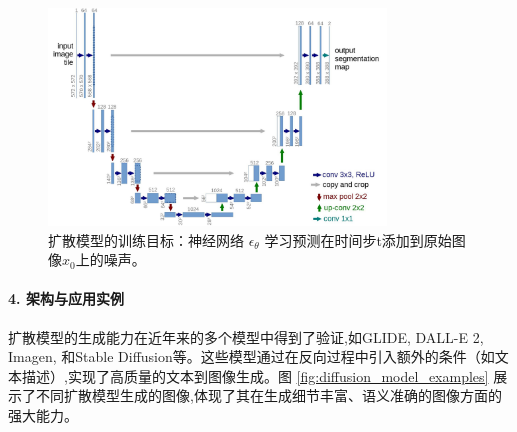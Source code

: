 \begin{itemize}
    \begin{figure}[htbp]
        \centering
        \includegraphics[width=0.8\textwidth]{figures/D3.png}
        \caption{扩散模型的训练目标：神经网络 $\epsilon_\theta$ 学习预测在时间步t添加到原始图像$x_0$上的噪声。}
        \label{fig:diffusion_training_objective}
    \end{figure}

    \paragraph{4. 架构与应用实例}
    扩散模型的生成能力在近年来的多个模型中得到了验证,如GLIDE, DALL-E 2, Imagen, 和Stable Diffusion等。这些模型通过在反向过程中引入额外的条件（如文本描述）,实现了高质量的文本到图像生成。图 \ref{fig:diffusion_model_examples} 展示了不同扩散模型生成的图像,体现了其在生成细节丰富、语义准确的图像方面的强大能力。


\end{itemize}
